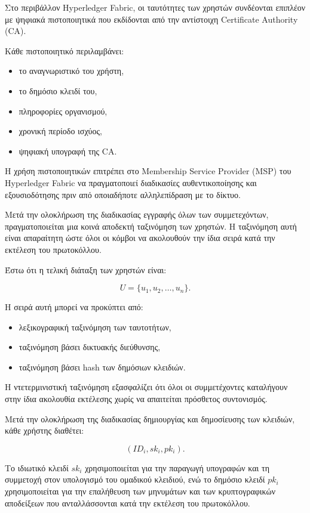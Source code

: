 \documentclass[12pt,a4paper]{report}
\begin{document}
Στο περιβάλλον Hyperledger Fabric, οι ταυτότητες των χρηστών συνδέονται επιπλέον με ψηφιακά πιστοποιητικά που εκδίδονται από την αντίστοιχη Certificate Authority (CA).

Κάθε πιστοποιητικό περιλαμβάνει:

\begin{itemize}
\item το αναγνωριστικό του χρήστη,
\item το δημόσιο κλειδί του,
\item πληροφορίες οργανισμού,
\item χρονική περίοδο ισχύος,
\item ψηφιακή υπογραφή της CA.
\end{itemize}

Η χρήση πιστοποιητικών επιτρέπει στο Membership Service Provider (MSP) του Hyperledger Fabric να πραγματοποιεί διαδικασίες αυθεντικοποίησης και εξουσιοδότησης πριν από οποιαδήποτε αλληλεπίδραση με το δίκτυο.

Μετά την ολοκλήρωση της διαδικασίας εγγραφής όλων των συμμετεχόντων, πραγματοποιείται μια κοινά αποδεκτή ταξινόμηση των χρηστών. Η ταξινόμηση αυτή είναι απαραίτητη ώστε όλοι οι κόμβοι να ακολουθούν την ίδια σειρά κατά την εκτέλεση του πρωτοκόλλου.

Έστω ότι η τελική διάταξη των χρηστών είναι:

\[
U = \{u_1,u_2,\ldots,u_n\}.
\]

Η σειρά αυτή μπορεί να προκύπτει από:

\begin{itemize}
\item λεξικογραφική ταξινόμηση των ταυτοτήτων,
\item ταξινόμηση βάσει δικτυακής διεύθυνσης,
\item ταξινόμηση βάσει hash των δημόσιων κλειδιών.
\end{itemize}

Η ντετερμινιστική ταξινόμηση εξασφαλίζει ότι όλοι οι συμμετέχοντες καταλήγουν στην ίδια ακολουθία εκτέλεσης χωρίς να απαιτείται πρόσθετος συντονισμός.

Μετά την ολοκλήρωση της διαδικασίας δημιουργίας και δημοσίευσης των κλειδιών, κάθε χρήστης διαθέτει:

\[
(ID_i, sk_i, pk_i).
\]

Το ιδιωτικό κλειδί $sk_i$ χρησιμοποιείται για την παραγωγή υπογραφών και τη συμμετοχή στον υπολογισμό του ομαδικού κλειδιού, ενώ το δημόσιο κλειδί $pk_i$ χρησιμοποιείται για την επαλήθευση των μηνυμάτων και των κρυπτογραφικών αποδείξεων που ανταλλάσσονται κατά την εκτέλεση του πρωτοκόλλου.
\end{document}
